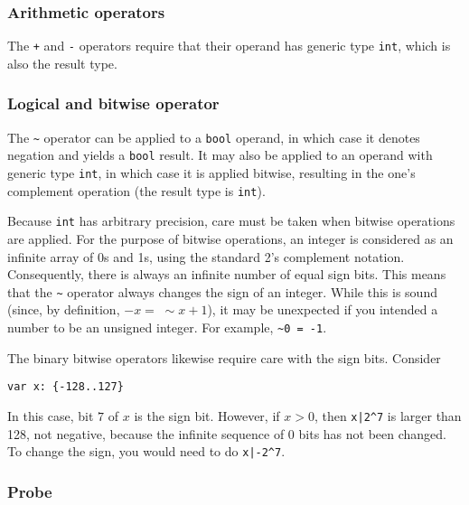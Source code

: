 \subsubsection{Arithmetic operators}\label{sec:prefixarith}

The {\tt{}+} and {\tt{}-} operators require that their operand has generic type
{\tt{}int}, which is also the result type.

\subsubsection{Logical and bitwise operator}\label{sec:prefixlogical}

The \verb|~| operator can be applied to a {\tt{}bool} operand, in which case
it denotes negation and yields a {\tt{}bool} result. It may also be
applied to an operand with generic type {\tt{}int}, in which case
it is applied bitwise, resulting in the one's complement operation
(the result type is {\tt{}int}).

Because {\tt{}int} has arbitrary precision, care must be taken when
bitwise operations are applied. For the purpose of bitwise operations,
an integer is considered as an infinite array of 0s and 1s, using the
standard 2's complement notation. Consequently, there is always an
infinite number of equal sign bits. This means that the \verb|~| operator
always changes the sign of an integer. While this is sound
(since, by definition, $-x = \; \sim \!\! x + 1$), it may be unexpected if
you intended a number to be an unsigned integer. For example,
\verb|~0 = -1|.

The binary bitwise operators likewise require care with the sign bits.
Consider
\begin{verbatim}
var x: {-128..127}
\end{verbatim}
In this case, bit $7$ of $x$ is the sign bit. However, if $x>0$,
then \verb'x|2^7' is larger than 128, not negative, because the infinite
sequence of 0 bits has not been changed. To change the sign, you would
need to do \verb'x|-2^7'.

\subsubsection{Probe}\label{sec:probe}

